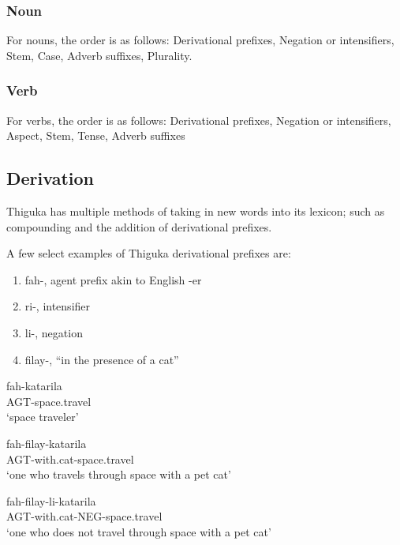 \subsubsection{Noun}
For nouns, the order is as follows: Derivational prefixes, Negation or intensifiers, Stem, Case, Adverb suffixes, Plurality.

\subsubsection{Verb}
For verbs, the order is as follows: Derivational prefixes, Negation or intensifiers, Aspect, Stem, Tense, Adverb suffixes

\subsection{Derivation}
Thiguka has multiple methods of taking in new words into its lexicon; such as compounding and the addition of derivational prefixes.

A few select examples of Thiguka derivational prefixes are:

\begin{enumerate}
    \item fah-, agent prefix akin to English -er
    \item ri-, intensifier
    \item li-, negation
    \item filay-, ``in the presence of a cat''
\end{enumerate}

\begin{exe}
    \ex{} \gll{}fah-katarila\\
    AGT-space.travel\\
    \glt{}`space traveler'
\end{exe}

\begin{exe}
    \ex{} \gll{}fah-filay-katarila\\
    AGT-with.cat-space.travel\\
    \glt{}`one who travels through space with a pet cat'
\end{exe}

\begin{exe}
    \ex{} \gll{}fah-filay-li-katarila\\
    AGT-with.cat-NEG-space.travel\\
    \glt{}`one who does not travel through space with a pet cat'
\end{exe}

